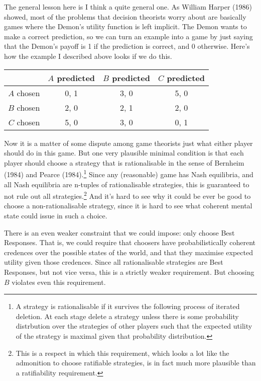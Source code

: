\documentclass[11pt,]{article}
\let\rmarkdownfootnote\footnote%
\def\footnote{\protect\rmarkdownfootnote}
\begin{document}
The general lesson here is I think a quite general one. As William Harper (1986) showed, most of the problems that decision theorists worry about are basically games where the Demon's utility function is left implicit. The Demon wants to make a correct prediction, so we can turn an example into a game by just saying that the Demon's payoff is 1 if the prediction is correct, and 0 otherwise. Here's how the example I described above looks if we do this.

\begin{longtable}[]{@{}rccc@{}}
\toprule
& \(A\) predicted & \(B\) predicted & \(C\) predicted\tabularnewline
\midrule
\endhead
\(A\) chosen & 0, 1 & 3, 0 & 5, 0\tabularnewline
\(B\) chosen & 2, 0 & 2, 1 & 2, 0\tabularnewline
\(C\) chosen & 5, 0 & 3, 0 & 0, 1\tabularnewline
\bottomrule
\end{longtable}

Now it is a matter of some dispute among game theorists just what either player should do in this game. But one very plausible minimal condition is that each player should choose a strategy that is rationalisable in the sense of Bernheim (1984) and Pearce (1984).\footnote{A strategy is rationalisable if it survives the following process of iterated deletion. At each stage delete a strategy unless there is some probability distrbution over the strategies of other players such that the expected utility of the strategy is maximal given that probability distribution.} Since any (reasonable) game has Nash equilibria, and all Nash equilibria are n-tuples of rationalisable strategies, this is guaranteed to not rule out all strategies.\footnote{This is a respect in which this requirement, which looks a lot like the admonition to choose ratifiable strategies, is in fact much more plausible than a ratifiability requirement.} And it's hard to see why it could be ever be good to choose a non-rationalisable strategy, since it is hard to see what coherent mental state could issue in such a choice.

There is an even weaker constraint that we could impose: only choose Best Responses. That is, we could require that choosers have probabilistically coherent credences over the possible states of the world, and that they maximise expected utility given those credences. Since all rationalisable strategies are Best Responses, but not vice versa, this is a strictly weaker requirement. But choosing \(B\) violates even this requirement.
\end{document}
